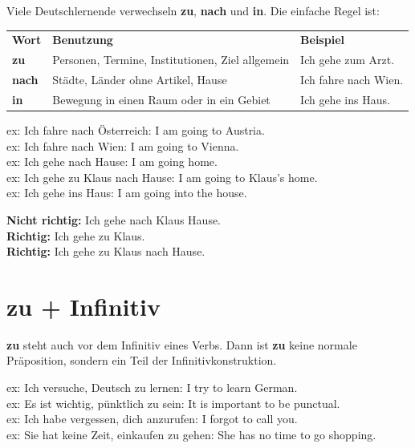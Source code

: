 \documentclass[a4paper,12pt]{article}
\begin{document}
        Viele Deutschlernende verwechseln \textbf{zu}, \textbf{nach} und \textbf{in}. Die einfache Regel ist:
        
        \begin{tabular}{>{\bfseries}p{3cm}p{5.5cm}p{5.5cm}}
            \rowcolor{HeaderBlueDark}
            \color{white}\textbf{Wort} & \color{white}\textbf{Benutzung}                  & \color{white}\textbf{Beispiel} \\
            zu                         & Personen, Termine, Institutionen, Ziel allgemein & Ich gehe zum Arzt.             \\
            nach                       & Städte, Länder ohne Artikel, Hause               & Ich fahre nach Wien.           \\
            in                         & Bewegung in einen Raum oder in ein Gebiet        & Ich gehe ins Haus.             \\
        \end{tabular}
        
        ex: Ich fahre nach Österreich: I am going to Austria.\\
        ex: Ich fahre nach Wien: I am going to Vienna.\\
        ex: Ich gehe nach Hause: I am going home.\\
        ex: Ich gehe zu Klaus nach Hause: I am going to Klaus's home.\\
        ex: Ich gehe ins Haus: I am going into the house.
        
        \textbf{Nicht richtig:} Ich gehe nach Klaus Hause.\\
        \textbf{Richtig:} Ich gehe zu Klaus.\\
        \textbf{Richtig:} Ich gehe zu Klaus nach Hause.
    
    
    \section{zu + Infinitiv}
        
        \textbf{zu} steht auch vor dem Infinitiv eines Verbs. Dann ist \textbf{zu} keine normale Präposition, sondern ein Teil der Infinitivkonstruktion.
        
        ex: Ich versuche, Deutsch zu lernen: I try to learn German.\\
        ex: Es ist wichtig, pünktlich zu sein: It is important to be punctual.\\
        ex: Ich habe vergessen, dich anzurufen: I forgot to call you.\\
        ex: Sie hat keine Zeit, einkaufen zu gehen: She has no time to go shopping.
        
\end{document}
